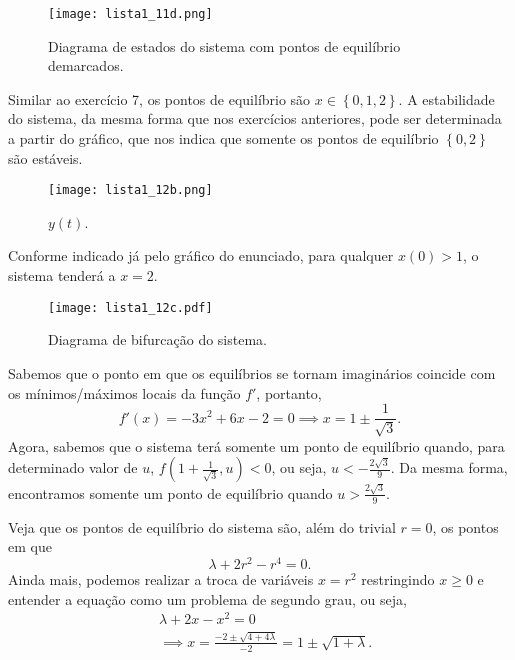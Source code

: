 \documentclass[a4paper]{report}
\begin{document}

\begin{figure}[H]
    \centering
    \texttt{[image: lista1\_11d.png]}
    \caption{Diagrama de estados do sistema com pontos de equilíbrio demarcados.}
    \label{fig:lista1_11d-png}
\end{figure}



Similar ao exercício 7, os pontos de equilíbrio são $x \in \left\{ 0, 1, 2 \right\} $. A estabilidade do sistema, da mesma forma que nos exercícios anteriores, pode ser determinada a partir do gráfico, que nos indica que somente os pontos de equilíbrio $\left\{ 0,2 \right\} $ são estáveis.


\begin{figure}[H]
    \centering
    \texttt{[image: lista1\_12b.png]}
    \caption{$y(t)$.}
    \label{fig:lista1_12b-png}
\end{figure}

Conforme indicado já pelo gráfico do enunciado, para qualquer $x(0)>1$, o sistema tenderá a  $x=2$.


\begin{figure}[H]
    \centering
    \texttt{[image: lista1\_12c.pdf]}
    \caption{Diagrama de bifurcação do sistema.}
    \label{fig:lista1_12c-pdf}
\end{figure}



Sabemos que o ponto em que os equilíbrios se tornam imaginários coincide com os mínimos/máximos locais da função $f'$, portanto, \[
    f'(x) = -3x^2 +6x -2 = 0 \implies x = 1 \pm \frac{1}{\sqrt{3} }
.\] Agora, sabemos que o sistema terá somente um ponto de equilíbrio quando, para determinado valor de $u$, $f(1+\frac{1}{\sqrt{3} }, u) <0$, ou seja, $u < -\frac{2\sqrt{3} }{9}$. Da mesma forma, encontramos somente um ponto de equilíbrio quando $u>\frac{2\sqrt{3} }{9}$.


Veja que os pontos de equilíbrio do sistema são, além do trivial $r=0$, os pontos em que \[
\lambda + 2r^2 - r^{4} = 0
.\] Ainda mais, podemos realizar a troca de variáveis $x=r^2$ restringindo $x\ge 0$ e entender a equação como um problema de segundo grau, ou seja,
\begin{align*}
    & \lambda +2x - x^2 = 0 \\
    & \implies x = \frac{-2 \pm \sqrt{4 + 4\lambda} }{-2} = 1 \pm \sqrt{1+\lambda}
.\end{align*}
\end{document}
